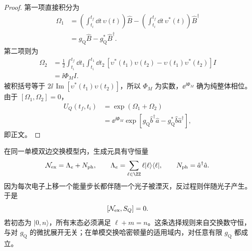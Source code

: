 \begin{proof}
第一项直接积分为
\begin{align*}
\Omega_1
&=\left(\int_{t_i}^{t_f}\dd t\,\upsilon(t)\right)\hat B
-\left(\int_{t_i}^{t_f}\dd t\,\upsilon^*(t)\right)\hat B^\dagger\\
&=g_{\mathrm Q}\hat B-g_{\mathrm Q}^*\hat B^\dagger.
\end{align*}
第二项则为
\begin{align*}
\Omega_2
&=\frac12\int_{t_i}^{t_f}\dd t_1
\int_{t_i}^{t_1}\dd t_2\,
[\upsilon^*(t_1)\upsilon(t_2)-\upsilon(t_1)\upsilon^*(t_2)]I\\
&=\ii\Phi_M I.
\end{align*}
被积括号等于 $2\ii\,\operatorname{Im}[\upsilon^*(t_1)\upsilon(t_2)]$，所以 $\Phi_M$ 为实数，$\ee^{\ii\Phi_M}$ 确为纯整体相位。由于 $[\Omega_1,\Omega_2]=0$，
\begin{align*}
U_Q(t_f,t_i)
&=\exp(\Omega_1+\Omega_2)\\
&=\ee^{\ii\Phi_M}
\exp[g_{\mathrm Q}\hat b^\dagger\hat a-g_{\mathrm Q}^*\hat b\hat a^\dagger],
\end{align*}
即正文。
\end{proof}


在同一单模双边交换模型内，生成元具有守恒量
\begin{equation}
{
\mathcal N_{\rm ex}=\Lambda_e+N_{\rm ph},
\qquad
\Lambda_e=\sum_{\ell\in\ZZ}\ell|\ell\rangle\langle\ell|,
\qquad
N_{\rm ph}=\hat a^\dagger\hat a.}
\label{eq:qpinem-exchange-number-dp68}
\end{equation}
因为每次电子上移一个能量步长都伴随一个光子被湮灭，反过程则伴随光子产生。于是
\begin{equation}
{[\mathcal N_{\rm ex},S_Q]=0.}
\label{eq:qpinem_conservation}
\end{equation}
若初态为 $|0,n\rangle$，所有末态必须满足 $\ell+m=n$。这条选择规则来自交换数守恒，与对 $g_{\mathrm Q}$ 的微扰展开无关；在单模交换哈密顿量的适用域内，对任意有限 $g_{\mathrm Q}$ 都成立。

